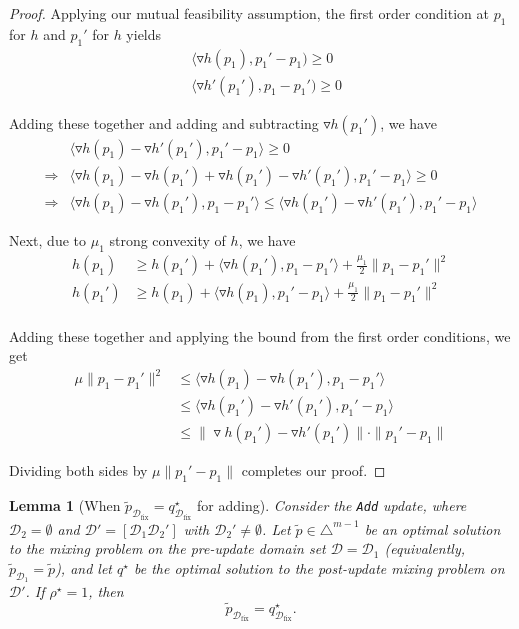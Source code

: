 \documentclass[table]{ai2style/ai2}
\newtheorem{lemma}{Lemma}
\newcommand{\D}[0]{\mathcal{D}}
\newcommand{\Dfix}[0]{\mathcal{D}_{\text{fix}}}
\newcommand{\Add}[0]{\texttt{Add}\xspace}
\begin{document}
\begin{proof}
Applying our mutual feasibility assumption, the first order condition at $p_1$ for $h$ and $p_1'$ for $h$ yields
\begin{align*}
    &\langle \triangledown h(p_1), p_1' - p_1) \ge 0 \\
    &\langle \triangledown h'(p_1'), p_1 - p_1') \ge 0
\end{align*}

Adding these together and adding and subtracting $\triangledown h(p_1')$, we have
\begin{align*}
    &\langle \triangledown h(p_1) - \triangledown h'(p_1'), p_1' - p_1 \rangle \ge 0 \\
    \Rightarrow &\langle \triangledown h(p_1) - \triangledown h(p_1') + \triangledown h(p_1') - \triangledown h'(p_1'), p_1' - p_1 \rangle \ge 0 \\
    \Rightarrow &\langle \triangledown h(p_1) - \triangledown h(p_1'), p_1 - p_1' \rangle \le \langle \triangledown h(p_1') - \triangledown h'(p_1'), p_1' - p_1 \rangle
\end{align*}

Next, due to $\mu_1$ strong convexity of $h$, we have
\begin{align*}
    h(p_1) &\ge h(p_1') + \langle \triangledown h(p_1'), p_1 - p_1' \rangle + \frac{\mu_1}{2} \| p_1 - p_1'\|^2 \\
    h(p_1') &\ge h(p_1) + \langle \triangledown h(p_1), p_1' - p_1 \rangle + \frac{\mu_1}{2} \| p_1 - p_1'\|^2 \\
\end{align*}

Adding these together and applying the bound from the first order conditions, we get
\begin{align*}
    \mu \| p_1 - p_1'\|^2 &\le \langle \triangledown h(p_1) - \triangledown h(p_1'), p_1 - p_1' \rangle  \\
    &\le \langle \triangledown h(p_1') - \triangledown h'(p_1'), p_1' - p_1 \rangle \\
    &\le \|\triangledown h(p_1') - \triangledown h'(p_1') \| \cdot \| p_1' - p_1\|
\end{align*}

Dividing both sides by $\mu \|p_1' - p_1\|$ completes our proof.
\end{proof}

\begin{lemma}[When $\tilde{p}_{\Dfix} = q^\star_{\Dfix}$ for adding]\label{lem:add_exactness}
Consider the \Add update, where $\D_2=\emptyset$ and $\D'=[\D_1\D_2']$ with $\D_2'\neq\emptyset$.
Let $\tilde p\in\triangle^{m-1}$ be an optimal solution to the mixing problem on the pre-update domain set $\D=\D_1$ (equivalently, $\tilde p_{\D_1}=\tilde p$), and let $q^\star$ be the optimal solution to the post-update mixing problem on $\D'$.
If $\rho^\star=1$, then
\[
\tilde p_{\Dfix} = q^\star_{\Dfix}.
\]
\end{lemma}
\end{document}
